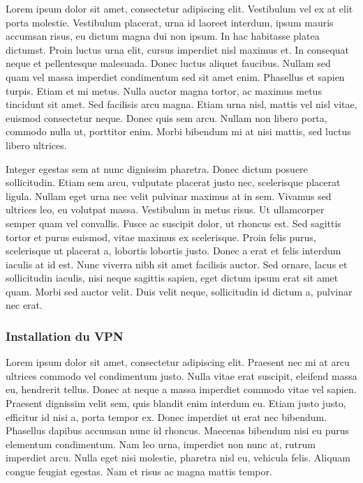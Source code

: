 \documentclass{report}
\begin{document}
Lorem ipsum dolor sit amet, consectetur adipiscing elit. Vestibulum vel ex at elit porta molestie. Vestibulum placerat, urna id laoreet interdum, ipsum mauris accumsan risus, eu dictum magna dui non ipsum. In hac habitasse platea dictumst. Proin luctus urna elit, cursus imperdiet nisl maximus et. In consequat neque et pellentesque malesuada. Donec luctus aliquet faucibus. Nullam sed quam vel massa imperdiet condimentum sed sit amet enim. Phasellus et sapien turpis. Etiam et mi metus. Nulla auctor magna tortor, ac maximus metus tincidunt sit amet. Sed facilisis arcu magna. Etiam urna nisl, mattis vel nisl vitae, euismod consectetur neque. Donec quis sem arcu. Nullam non libero porta, commodo nulla ut, porttitor enim. Morbi bibendum mi at nisi mattis, sed luctus libero ultrices.

Integer egestas sem at nunc dignissim pharetra. Donec dictum posuere sollicitudin. Etiam sem arcu, vulputate placerat justo nec, scelerisque placerat ligula. Nullam eget urna nec velit pulvinar maximus at in sem. Vivamus sed ultrices leo, eu volutpat massa. Vestibulum in metus risus. Ut ullamcorper semper quam vel convallis. Fusce ac suscipit dolor, ut rhoncus est. Sed sagittis tortor et purus euismod, vitae maximus ex scelerisque. Proin felis purus, scelerisque ut placerat a, lobortis lobortis justo. Donec a erat et felis interdum iaculis at id est. Nunc viverra nibh sit amet facilisis auctor. Sed ornare, lacus et sollicitudin iaculis, nisi neque sagittis sapien, eget dictum ipsum erat sit amet quam. Morbi sed auctor velit. Duis velit neque, sollicitudin id dictum a, pulvinar nec erat.

\subsubsection{Installation du VPN}

Lorem ipsum dolor sit amet, consectetur adipiscing elit. Praesent nec mi at arcu ultrices commodo vel condimentum justo. Nulla vitae erat suscipit, eleifend massa eu, hendrerit tellus. Donec at neque a massa imperdiet commodo vitae vel sapien. Praesent dignissim velit sem, quis blandit enim interdum eu. Etiam justo justo, efficitur id nisi a, porta tempor ex. Donec imperdiet ut erat nec bibendum. Phasellus dapibus accumsan nunc id rhoncus. Maecenas bibendum nisi eu purus elementum condimentum. Nam leo urna, imperdiet non nunc at, rutrum imperdiet arcu. Nulla eget nisi molestie, pharetra nisl eu, vehicula felis. Aliquam congue feugiat egestas. Nam et risus ac magna mattis tempor.
\end{document}
